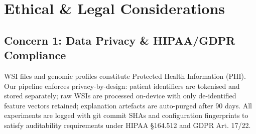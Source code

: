 \documentclass[11pt,a4paper]{article}
\begin{document}
\section{Ethical \& Legal Considerations}
\label{sec:ethics}
%
%
%
\subsection{Concern 1: Data Privacy \& HIPAA/GDPR Compliance}
WSI files and genomic profiles constitute Protected Health Information (PHI). Our pipeline enforces privacy-by-design: patient identifiers are tokenised and stored separately; raw WSIs are processed on-device with only de-identified feature vectors retained; explanation artefacts are auto-purged after 90 days. All experiments are logged with git commit SHAs and configuration fingerprints to satisfy auditability requirements under HIPAA §164.512 and GDPR Art. 17/22.
\end{document}
